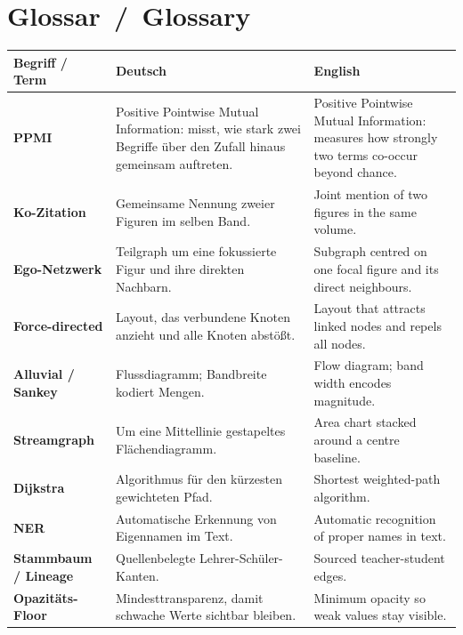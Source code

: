 \documentclass[11pt,a4paper,twoside]{article}
\begin{document}
\section{Glossar \,/\, Glossary}
\renewcommand{\arraystretch}{1.3}
\noindent\begin{tabularx}{\textwidth}{@{}>{\bfseries\sffamily}l X X@{}}
\toprule
\sffamily\textbf{Begriff / Term} & \sffamily\textbf{Deutsch} & \sffamily\textbf{English}\\
\midrule
PPMI & Positive Pointwise Mutual Information: misst, wie stark zwei Begriffe über den Zufall hinaus gemeinsam auftreten. & Positive Pointwise Mutual Information: measures how strongly two terms co-occur beyond chance. \\
Ko-Zitation & Gemeinsame Nennung zweier Figuren im selben Band. & Joint mention of two figures in the same volume. \\
Ego-Netzwerk & Teilgraph um eine fokussierte Figur und ihre direkten Nachbarn. & Subgraph centred on one focal figure and its direct neighbours. \\
Force-directed & Layout, das verbundene Knoten anzieht und alle Knoten abstößt. & Layout that attracts linked nodes and repels all nodes. \\
Alluvial / Sankey & Flussdiagramm; Bandbreite kodiert Mengen. & Flow diagram; band width encodes magnitude. \\
Streamgraph & Um eine Mittellinie gestapeltes Flächendiagramm. & Area chart stacked around a centre baseline. \\
Dijkstra & Algorithmus für den kürzesten gewichteten Pfad. & Shortest weighted-path algorithm. \\
NER & Automatische Erkennung von Eigennamen im Text. & Automatic recognition of proper names in text. \\
Stammbaum / Lineage & Quellenbelegte Lehrer-Schüler-Kanten. & Sourced teacher-student edges. \\
Opazitäts-Floor & Mindesttransparenz, damit schwache Werte sichtbar bleiben. & Minimum opacity so weak values stay visible. \\
\bottomrule
\end{tabularx}
\end{document}
